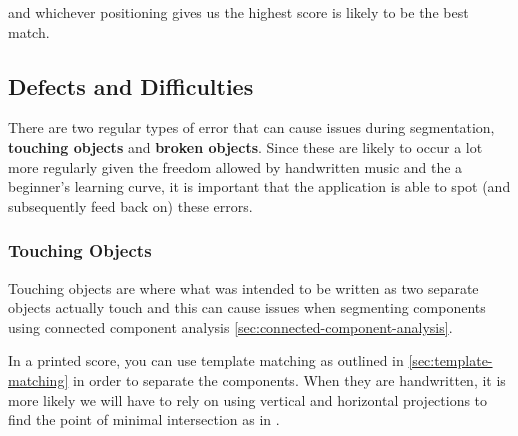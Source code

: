 and whichever positioning gives us the highest score is likely to be the best match.

\subsection{Defects and Difficulties}

There are two regular types of error that can cause issues during segmentation, \textbf{touching objects} and \textbf{broken objects}. Since these are likely to occur a lot more regularly given the freedom allowed by handwritten music and the a beginner's learning curve, it is important that the application is able to spot (and subsequently feed back on) these errors.

\subsubsection{Touching Objects}

Touching objects are where what was intended to be written as two separate objects actually touch and this can cause issues when segmenting components using connected component analysis \cref{sec:connected-component-analysis}. 

In a printed score, you can use template matching as outlined in \cref{sec:template-matching} in order to separate the components. When they are handwritten, it is more likely we will have to rely on using vertical and horizontal projections to find the point of minimal intersection as in \cite{fujinaga1996adaptive}.
